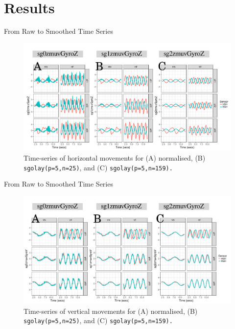 \section{Results}

{
\begin{frame}{From Raw to Smoothed Time Series}
   \begin{figure}
        \includegraphics[width=0.9\linewidth]{./figs/results/ch6-ts-h/versions/drawing-v00}{}
	\caption{Time-series of horizontal movements for 
	(A) normalised, (B) \texttt{sgolay(p=5,n=25)}, and 
	(C) \texttt{sgolay(p=5,n=159).} } 
   \end{figure}
\end{frame}
}


{
\begin{frame}{From Raw to Smoothed Time Series}
   \begin{figure}
        \includegraphics[width=0.9\linewidth]{./figs/results/ch6-ts-v/versions/drawing-v00}{}
	\caption{Time-series of vertical movements for 
	(A) normalised, (B) \texttt{sgolay(p=5,n=25)}, and 
	(C) \texttt{sgolay(p=5,n=159).} } 
   \end{figure}
\end{frame}
}



